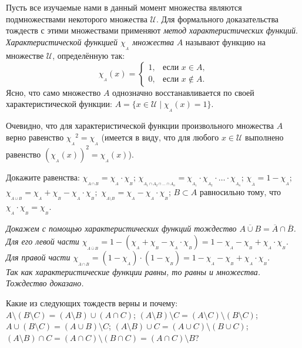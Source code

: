 \documentclass[a4paper,12pt]{article}
\newcommand{\0}[1]{\overline{#1}}
\begin{document}

Пусть все изучаемые нами в данный момент множества являются подмножествами некоторого множества $\mathcal{U}$.
Для формального доказательства тождеств с этими множествами применяют \emph{метод
характеристических функций}. \emph{Характеристической функцией
$\chi_{{}_A}$ множества} $A$ называют функцию на множестве
$\mathcal{U}$, определённую так:
$$
\chi_{{}_A}(x)=
\begin{cases}
1,&\text{если }x\in A,\\
0,&\text{если }x\notin A.
\end{cases}
$$
Ясно, что само множество $A$ однозначно восстанавливается по своей
характеристической функции:
$A=\{x\in\mathcal{U}\mid\chi_{{}_A}(x)=1\}$.

Очевидно, что для характеристической функции произвольного множества $A$ верно
равенство ${\chi_{{}_A}}^2=\chi_{{}_A}$ (имеется в виду, что для
любого $x\in\mathcal{U}$ выполнено равенство
$\left({\chi_{{}_A}(x)}\right)^2=\chi_{{}_A}(x)$).

Докажите равенства:
 $\chi_{{}_{A\cap B}}=\chi_{{}_A}\cdot\chi_{{}_B}$;
 $\chi_{{}_{A_1\cap A_2\cap\ldots\cap A_n}}=\chi_{{}_{A_1}}\cdot\chi_{{}_{A_2}}\cdot\ldots\cdot\chi_{{}_{A_n}}$;
 $\chi_{{}_{\0A}}=1-\chi_{{}_A}$;
 $\chi_{{}_{A\cup B}}=\chi_{{}_A}+\chi_{{}_B}-\chi_{{}_A}\cdot\chi_{{}_B};$
 $\chi_{{}_{A\setminus B}}=\chi_{{}_A}-\chi_{{}_A}\cdot\chi_{{}_B}$;
 $B\subset A$ равносильно тому, что $\chi_{{}_A}\cdot\chi_{{}_B}=\chi_{{}_B}$.

\medskip

\noindent
\textit{%
Докажем с помощью характеристических функций тождество $\0{A\cup
B}=\0A\cap\0B$. 
\\ Для его левой части
$
\chi_{{}_{\0{A\cup
B}}}=1-(\chi_{{}_A}+\chi_{{}_B}-\chi_{{}_A}\cdot\chi_{{}_B})=
1-\chi_{{}_A}-\chi_{{}_B}+\chi_{{}_A}\cdot\chi_{{}_B}.
$
\\Для правой части
$
\chi_{{}_{\0A\cap\0B}}=(1-\chi_{{}_A})\cdot(1-\chi_{{}_B})=
1-\chi_{{}_A}-\chi_{{}_B}+\chi_{{}_A}\cdot\chi_{{}_B}.
$
\\Так как характеристические функции равны, то равны и множества.
Тождество доказано.
}
\medskip



Какие из следующих тождеств верны и почему:
 $A\setminus(B\setminus C)=(A\setminus B)\cup (A\cap C)$;
 $(A\setminus B)\setminus C=(A\setminus C)\setminus(B\setminus C)$;
 $A\cup (B\setminus C)=(A\cup B)\setminus C$;
 $(A\setminus B)\cup C=(A\cup C)\setminus(B\cup C)$;
 $(A\setminus B)\cap C=(A\cap C)\setminus(B\cap C)=(A\cap C)\setminus B$?
\end{document}
